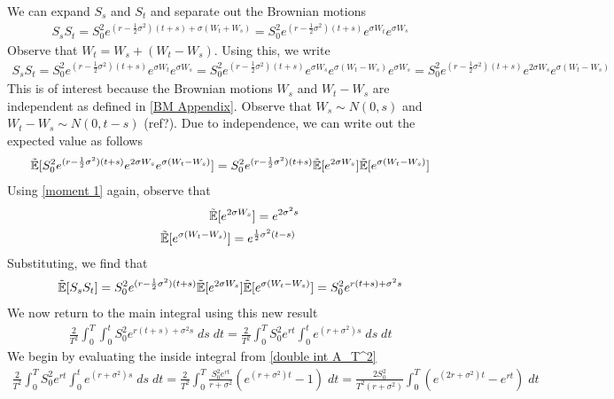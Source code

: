 \documentclass[reqno]{amsart}
\newcommand{\rE}[1]{\tilde{\E}[#1]}
\begin{document}
We can expand $S_s$ and $S_t$ and separate out the Brownian motions
\begin{align}
     S_{s} S_{t} 
     = S_0^2 e^{(r-\frac{1}{2}\sigma^2)(t+s)+\sigma(W_t+W_s)}
     = S_0^2 e^{(r-\frac{1}{2}\sigma^2)(t+s)} e^{\sigma W_t} e^{\sigma W_s}
\end{align}
Observe that $W_t = W_s + (W_t - W_s)$. Using this, we write
\begin{align}
     S_{s} S_{t} 
     = S_0^2 e^{(r-\frac{1}{2}\sigma^2)(t+s)} e^{\sigma W_t} e^{\sigma W_s}
     = S_0^2 e^{(r-\frac{1}{2}\sigma^2)(t+s)} e^{\sigma W_s} e^{\sigma (W_t - W_s)} e^{\sigma W_s}
     = S_0^2 e^{(r-\frac{1}{2}\sigma^2)(t+s)} e^{2 \sigma W_s} e^{\sigma (W_t - W_s)}
\end{align}
This is of interest because the Brownian motions $W_s$ and $W_t - W_s$ are independent as defined in \eqref{BM Appendix}.
Observe that $W_s \sim N(0, s)$ and $W_t - W_s \sim N(0, t-s)$ (ref?). Due to independence, we can write out the expected value as follows
\begin{align}
     \rE{S_0^2 e^{(r-\frac{1}{2}\sigma^2)(t+s)}e^{2 \sigma W_s} e^{\sigma (W_t - W_s)}}
     = S_0^2 e^{(r-\frac{1}{2}\sigma^2)(t+s)} \rE{e^{2 \sigma W_s}} \rE{e^{\sigma (W_t - W_s)}}
\end{align}
Using \eqref{moment 1} again, observe that
\begin{align}
     \rE{e^{2 \sigma W_s}} = e^{2 \sigma^2 s} \\
     \rE{e^{\sigma (W_t - W_s)}} = e^{\frac{1}{2} \sigma^2 (t-s)} \;
\end{align}
Substituting, we find that
\begin{align}
     \rE{S_{s} S_{t}} 
     = S_0^2 e^{(r-\frac{1}{2}\sigma^2)(t+s)} \rE{e^{2 \sigma W_s}} \rE{e^{\sigma (W_t - W_s)}}
     = S_0^2 e^{r(t+s)+\sigma^2s}
\end{align}
We now return to the main integral using this new result
\begin{align} \label{double int A_T^2}
     \frac{2}{T^2} \int_0^T \int_0^t S_0^2 e^{r(t+s)+\sigma^2s} \; ds \; dt = \frac{2}{T^2} \int_0^T S_0^2 e^{rt} \int_0^t e^{(r + \sigma^2)s} \; ds \; dt
\end{align}
We begin by evaluating the inside integral from \eqref{double int A_T^2}
\begin{align}
     \frac{2}{T^2} \int_0^T S_0^2 e^{rt} \int_0^t e^{(r + \sigma^2)s} \; ds \; dt = \frac{2}{T^2} \int_0^T \frac{S_0^2 e^{rt}}{r + \sigma^2} (e^{(r+\sigma^2)t} - 1) \; dt = \frac{2 S_0^2}{T^2(r + \sigma^2)} \int_0^T  (e^{(2r+\sigma^2)t} - e^{rt}) \; dt
\end{align}
\end{document}
